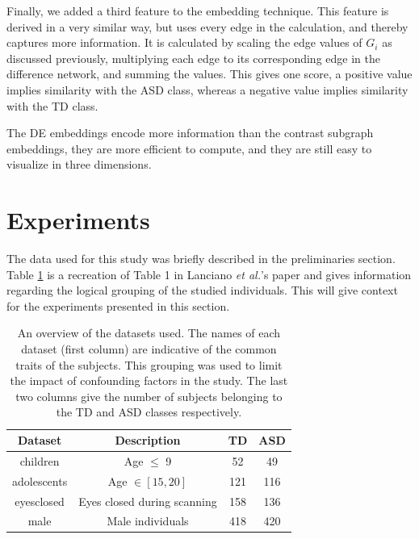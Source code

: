 \documentclass[sigconf]{acmart}
\begin{document}
Finally, we added a third feature to the embedding technique.
This feature is derived in a very similar way, but uses every edge in the calculation, and thereby captures more information.
It is calculated by scaling the edge values of $G_i$ as discussed previously, multiplying each edge to its corresponding edge in the difference network, and summing the values.
This gives one score, a positive value implies similarity with the ASD class, whereas a negative value implies similarity with the TD class.

The DE embeddings encode more information than the contrast subgraph embeddings, they are more efficient to compute, and they are still easy to visualize in three dimensions.



\section{Experiments}

The data used for this study was briefly described in the preliminaries section.
Table \ref{tab:datasets} is a recreation of Table 1 in Lanciano \emph{et al.}'s paper and gives information regarding the logical grouping of the studied individuals.
This will give context for the experiments presented in this section.

\begin{table}%
    \centering
    \caption{An overview of the datasets used. The names of each dataset (first column) are indicative of the common traits of the subjects. This grouping was used to limit the impact of confounding factors in the study. The last two columns give the number of subjects belonging to the TD and ASD classes respectively.}
    \begin{tabular}{c c c c}
        \hline
        Dataset & Description & TD & ASD \\
        \hline
        children &  Age $\leq$ 9 & 52 & 49 \\
        adolescents &  Age $\in [15,20]$ & 121 & 116 \\
        eyesclosed &  Eyes closed during scanning & 158 & 136 \\
        male &  Male individuals & 418 & 420 \\
        \hline
    \end{tabular}
    \label{tab:datasets}
\end{table}
\end{document}
